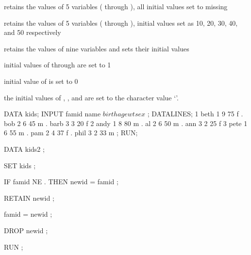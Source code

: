 \begin{frame}
\bi
\item {}
\item[] retains the values of 5 variables ( through ), all initial values set to missing
\item {}
\item[] retains the values of 5 variables ( through ), initial values set as 10, 20, 30, 40, and 50 respectively
\item {}
\item[] retains the values of nine variables and sets their initial values
\bi
\item initial values of  through  are set to 1
\item initial value of   is set to 0
\item the initial values of , , and  are set to the character value `'.
\ei
\ei
\end{frame}

\begin{frame}[fragile]
\footnotesize
\begin{code}{.0}
DATA kids;
INPUT famid name $ birth age wt sex $ ;
DATALINES;
1 beth 1  9  75  f
. bob  2  6  45  m
. barb 3  3  20  f
2 andy 1  8  80  m
. al   2  6  50  m
. ann  3  2  25  f
3 pete 1  6  55  m
. pam  2  4  37  f
. phil 3  2  33  m
;
RUN;
\end{code}
\emp
\end{frame}

\begin{frame}[fragile]
\footnotesize
\begin{code}{.0}
DATA kids2 ;

   SET kids ;
   
   IF famid NE . THEN newid = famid ;
   
   RETAIN newid ;
   
   famid = newid ;
   
   DROP newid ;

RUN ;
\end{code}
\emp


\end{frame}



